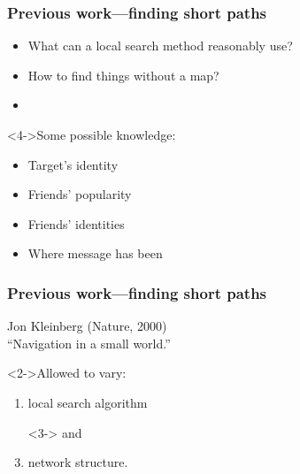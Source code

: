 \begin{frame}
  \frametitle{Previous work---finding short paths}

  \begin{block}{}
    \begin{itemize}
    \item<1-> What can a local search method reasonably use?
    \item<2->  How to find things without a map?
    \item<3-> 
    \end{itemize}
  \end{block}
  
  \bigskip

  \begin{block}<4->{Some possible knowledge:}
    \begin{itemize}
    \item<1-> Target's identity
    \item<1-> Friends' popularity 
    \item<1-> Friends' identities 
    \item<1-> Where message has been 
    \end{itemize}
  \end{block}

\end{frame}

\begin{frame}
  \frametitle{Previous work---finding short paths}

  \begin{block}{}
    Jon Kleinberg (Nature, 2000)\cite{kleinberg2000a}\\
    ``Navigation in a small world.''
  \end{block}

   \bigskip
   
   \begin{block}<2->{Allowed to vary:}
     \begin{enumerate}
     \item<2-> local search algorithm
     \item[]<3-> and
     \item<3-> network structure.
     \end{enumerate}
   \end{block}

\end{frame}

